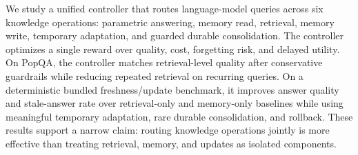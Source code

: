 We study a unified controller that routes language-model queries across six knowledge operations: parametric answering, memory read, retrieval, memory write, temporary adaptation, and guarded durable consolidation. The controller optimizes a single reward over quality, cost, forgetting risk, and delayed utility. On PopQA, the controller matches retrieval-level quality after conservative guardrails while reducing repeated retrieval on recurring queries. On a deterministic bundled freshness/update benchmark, it improves answer quality and stale-answer rate over retrieval-only and memory-only baselines while using meaningful temporary adaptation, rare durable consolidation, and rollback. These results support a narrow claim: routing knowledge operations jointly is more effective than treating retrieval, memory, and updates as isolated components.

